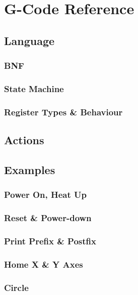 \chapter{G-Code Reference}
	
	\section{Language}
		
		\subsection{BNF}
			
			\label{sec:gcodebnf}
		
		\subsection{State Machine}
			
			\label{sec:stateMachine}
		
		\subsection{Register Types \& Behaviour}
	
	\section{Actions}
		
		\label{sec:gcodeactions}
	
	\section{Examples}
	
		\subsection{Power On, Heat Up}
		
		\subsection{Reset \& Power-down}
		
		\subsection{Print Prefix \& Postfix}
		
		\subsection{Home X \& Y Axes}
		
		\subsection{Circle}
